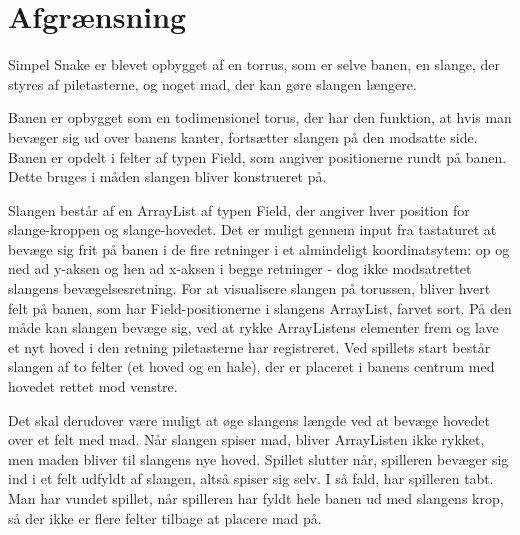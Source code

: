 \section{Afgrænsning}
Simpel Snake er blevet opbygget af en torrus, som er selve banen, en slange, der styres af piletasterne, og noget mad, der kan gøre slangen længere.

Banen er opbygget som en todimensionel torus, der har den funktion, at hvis man bevæger sig ud over banens kanter, fortsætter slangen på den modsatte side.
Banen er opdelt i felter af typen Field, som angiver positionerne rundt på banen. Dette bruges i måden slangen bliver konstrueret på.

Slangen består af en ArrayList af typen Field, der angiver hver position for slange-kroppen og slange-hovedet. Det er muligt gennem input fra tastaturet at bevæge sig frit på banen i de fire retninger i et almindeligt koordinatsytem: op og ned ad y-aksen og hen ad x-aksen i begge retninger - dog ikke modsatrettet slangens bevægelsesretning. For at visualisere slangen på torussen, bliver hvert felt på banen, som har Field-positionerne i slangens ArrayList, farvet sort. På den måde kan slangen bevæge sig, ved at rykke ArrayListens elementer frem og lave et nyt hoved i den retning piletasterne har registreret.
Ved spillets start består slangen af to felter (et hoved og en hale), der er placeret i banens centrum med hovedet rettet mod venstre. 

Det skal derudover være muligt at øge slangens længde ved at bevæge hovedet over et felt med mad. Når slangen spiser mad, bliver ArrayListen ikke rykket, men maden bliver til slangens nye hoved. Spillet slutter når, spilleren bevæger sig ind i et felt udfyldt af slangen, altså spiser sig selv. I så fald, har spilleren tabt. Man har vundet spillet, når spilleren har fyldt hele banen ud med slangens krop, så der ikke er flere felter tilbage at placere mad på. 